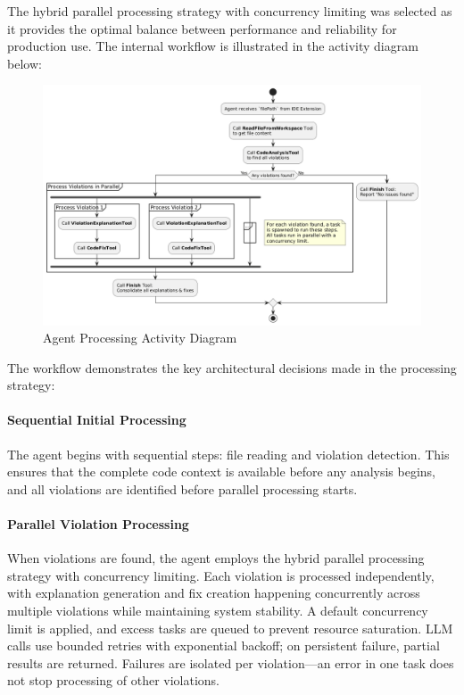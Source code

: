 \begin{spacing}{1.2}
The hybrid parallel processing strategy with concurrency limiting was selected as it provides the optimal balance between performance and reliability for production use. The internal workflow is illustrated in the activity diagram below:


\begin{figure}[H]
	\centering
\includegraphics[scale=0.5]{images/activity_diagram.png}
\caption{Agent Processing Activity Diagram}
\label{fig:agent_activity}
\end{figure}

The workflow demonstrates the key architectural decisions made in the processing strategy:

\paragraph{Sequential Initial Processing}
The agent begins with sequential steps: file reading and violation detection. This ensures that the complete code context is available before any analysis begins, and all violations are identified before parallel processing starts.

\paragraph{Parallel Violation Processing}
When violations are found, the agent employs the hybrid parallel processing strategy with concurrency limiting. Each violation is processed independently, with explanation generation and fix creation happening concurrently across multiple violations while maintaining system stability. A default concurrency limit is applied, and excess tasks are queued to prevent resource saturation. LLM calls use bounded retries with exponential backoff; on persistent failure, partial results are returned. Failures are isolated per violation—an error in one task does not stop processing of other violations.


\end{spacing}
